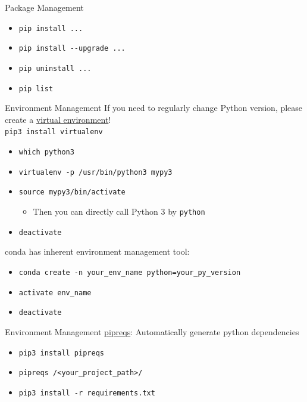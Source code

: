 \documentclass{../TexTemplate/myslide}
\begin{document}
\begin{frame}[fragile]{Package Management}
\begin{itemize}
	\item \verb'pip install ...'
	\item \verb'pip install --upgrade ...'
	\item \verb'pip uninstall ...'
	\item \verb'pip list'
\end{itemize}
\end{frame}

\begin{frame}[fragile]{Environment Management}
If you need to regularly change Python version, please create a \href{https://virtualenv.pypa.io/en/latest/}{virtual environment}!\\
\verb'pip3 install virtualenv'
\begin{itemize}
	\item \verb'which python3'
	\item \verb'virtualenv -p /usr/bin/python3 mypy3'
	\item \verb'source mypy3/bin/activate'
	\begin{itemize}
		\item Then you can directly call Python 3 by \verb'python'
	\end{itemize}
	\item \verb'deactivate'
\end{itemize}
conda has inherent environment management tool:
\begin{itemize}
	\item \verb'conda create -n your_env_name python=your_py_version'
	\item \verb'activate env_name'
	\item \verb'deactivate'
\end{itemize}
\end{frame}

\begin{frame}[fragile]{Environment Management}
\href{https://dev.to/bhupesh/pipreqs-automatically-generate-python-dependencies-30nl}{pipreqs}: Automatically generate python dependencies
\begin{itemize}
	\item \verb'pip3 install pipreqs'
	\item \verb'pipreqs /<your_project_path>/'
	\item \verb'pip3 install -r requirements.txt'
\end{itemize}
\end{frame}
\end{document}
